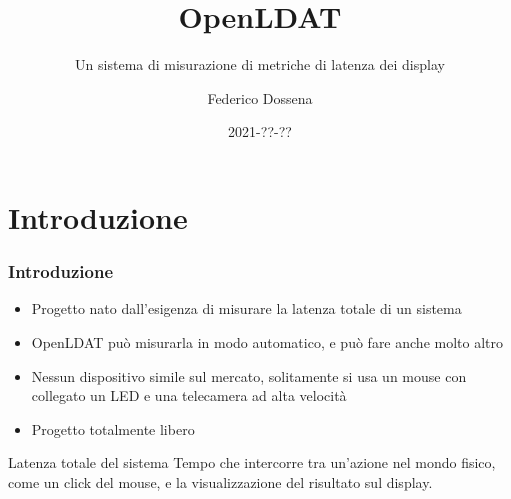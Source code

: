 \documentclass[xcolor={x11names}]{beamer}
\title{OpenLDAT}
\subtitle{Un sistema di misurazione di metriche di latenza dei display}
\author{Federico Dossena}
\institute{Università degli Studi di Milano}
\date{2021-??-??}
\begin{document}
	
\begin{frame}
	\titlepage
\end{frame}

\section{Introduzione}
\begin{frame}
	\frametitle{Introduzione}
	\begin{itemize}
		\item Progetto nato dall'esigenza di \alert{misurare la latenza totale di un sistema}
		\item \alert{OpenLDAT può misurarla in modo automatico}, e può fare anche molto altro
		\item \alert{Nessun dispositivo simile sul mercato}, solitamente si usa un mouse con collegato un LED e una telecamera ad alta velocità
		\item Progetto totalmente \alert{libero}
	\end{itemize}
	\begin{block}{Latenza totale del sistema}
		Tempo che intercorre tra un'azione nel mondo fisico, come un click del mouse, e la visualizzazione del risultato sul display.
	\end{block}
\end{frame}
\end{document}
